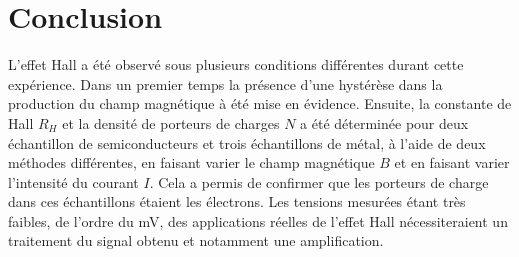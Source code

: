 \section{Conclusion}

L'effet Hall a été observé sous plusieurs conditions différentes durant cette expérience. Dans un premier temps la présence d'une hystérèse dans la production du champ magnétique à été mise en évidence. Ensuite, la constante de Hall \(R_H\) et la densité de porteurs de charges \(N\) a été déterminée pour deux échantillon de semiconducteurs et trois échantillons de métal, à l'aide de deux méthodes différentes, en faisant varier le champ magnétique \(B\) et en faisant varier l'intensité du courant \(I\). Cela a permis de confirmer que les porteurs de charge dans ces échantillons étaient les électrons. Les tensions mesurées étant très faibles, de l'ordre du \si{\milli\volt}, des applications réelles de l'effet Hall nécessiteraient un traitement du signal obtenu et notamment une amplification.